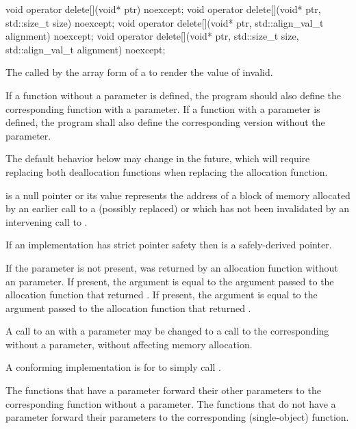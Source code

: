 %
\begin{itemdecl}
void operator delete[](void* ptr) noexcept;
void operator delete[](void* ptr, std::size_t size) noexcept;
void operator delete[](void* ptr, std::align_val_t alignment) noexcept;
void operator delete[](void* ptr, std::size_t size, std::align_val_t alignment) noexcept;
\end{itemdecl}

\begin{itemdescr}
\pnum
\effects
The
called by the array form of a
to render the value of  invalid.

\pnum
\replaceable
{}
If a function without a  parameter is defined,
the program should also define
the corresponding function with a  parameter.
If a function with a  parameter is defined,
the program shall also define
the corresponding version without the  parameter.
\begin{note}
The default behavior below may change in the future, which will require
replacing both deallocation functions when replacing the allocation function.
\end{note}

\pnum
\expects
{} is a null pointer or
its value represents the address of
a block of memory allocated by
an earlier call to a (possibly replaced)
or
which has not been invalidated by an intervening call to
.

\pnum
\expects
If an implementation has strict pointer safety
then  is a safely-derived pointer.

\pnum
\expects
If the  parameter is not present,
 was returned by an allocation function
without an  parameter.
If present, the  argument
is equal to the  argument
passed to the allocation function that returned .
If present, the  argument
is equal to the  argument
passed to the allocation function that returned .

\pnum
\required
A call to an 
with a  parameter
may be changed to
a call to the corresponding 
without a  parameter,
without affecting memory allocation.
\begin{note}
A conforming implementation is for
 to simply call
.
\end{note}

\pnum
{}
The functions that have a  parameter
forward their other parameters
to the corresponding function without a  parameter.
The functions that do not have a  parameter
forward their parameters
to the corresponding  (single-object) function.
\end{itemdescr}

